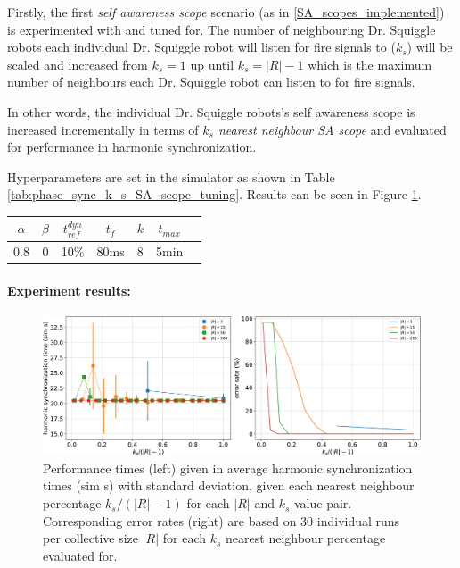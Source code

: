 				Firstly, the first \textit{self awareness scope} scenario (as in \ref{SA_scopes_implemented}) is experimented with and tuned for. The number of neighbouring Dr. Squiggle robots each individual Dr. Squiggle robot will listen for fire signals to ($k_s$) will be scaled and increased from $k_s=1$ up until $k_s=|R|-1$ which is the maximum number of neighbours each Dr. Squiggle robot can listen to for fire signals.

				In other words, the individual Dr. Squiggle robots's self awareness scope is increased incrementally in terms of \textit{$k_s$ nearest neighbour SA scope} and evaluated for performance in harmonic synchronization.

				Hyperparameters are set in the simulator as shown in Table \ref{tab:phase_sync_k_s_SA_scope_tuning}. Results can be seen in Figure \ref{fig:phase_sync_k_s_SA_scope_tuning}.

				\begin{center}
				\begin{tabular}{ |c|c|c|c|c|c|c| } 
				\hline
				$\alpha$ & $\beta$ & $t_{ref}^{dyn}$ & $t_f$ & $k$ & $t_{max}$ \\
				\hline
				0.8 & 0 & 10\% & 80ms & 8 & 5min \\
				\hline
				\end{tabular}
				\label{tab:phase_sync_k_s_SA_scope_tuning}
				\end{center}
				
				\paragraph{Experiment results:\nl}
				
				\begin{figure}[ht!]
					\centering
					\includegraphics[width=\linewidth]{Assets/DocSegments/Chapters/ExperimentsAndResults/Figures/PerfScores/phase_sync_k_s_SA_scope_tuning_experiment_performance.pdf}
					\caption[Experiment results for $\phi$ synchronization $k_s$ SA scope tuning experiment.]{Performance times (left) given in average harmonic synchronization times (sim s) with standard deviation, given each nearest neighbour percentage $k_s/(|R|-1)$ for each $|R|$ and $k_s$ value pair. Corresponding error rates (right) are based on 30 individual runs per collective size $|R|$ for each $k_s$ nearest neighbour percentage evaluated for.}
					\label{fig:phase_sync_k_s_SA_scope_tuning}
				\end{figure}

